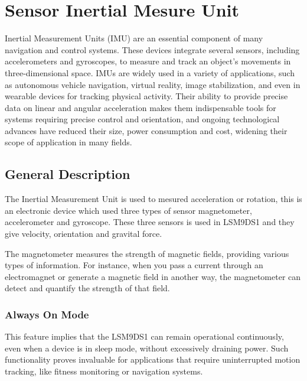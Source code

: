 %
%

\chapter{Sensor Inertial Mesure Unit}

Inertial Measurement Units (IMU) are an essential component of many navigation and control systems. These devices integrate several sensors, including accelerometers and gyroscopes, to measure and track an object's movements in three-dimensional space. IMUs are widely used in a variety of applications, such as autonomous vehicle navigation, virtual reality, image stabilization, and even in wearable devices for tracking physical activity. Their ability to provide precise data on linear and angular acceleration makes them indispensable tools for systems requiring precise control and orientation, and ongoing technological advances have reduced their size, power consumption and cost, widening their scope of application in many fields. 
\cite{st_lsm9ds1:2025} \cite{analogdevices:2024} 


\section{General Description }

The Inertial Measurement Unit is used to mesured acceleration or rotation, this is an electronic device which used three types of sensor magnetometer, accelerometer and gyroscope. These three sensors is used in LSM9DS1 and they give velocity, orientation and gravital force. 

The magnetometer measures the strength of magnetic fields, providing various types of information. For instance, when you pass a current through an electromagnet or generate a magnetic field in another way, the magnetometer can detect and quantify the strength of that field. \cite{st_microelectronics:2024}
\cite{STMicroelectronics_LSM9DS1:2024}

\subsection{Always On Mode}

This feature implies that the LSM9DS1 can remain operational continuously, even when a device is in sleep mode, without excessively draining power. Such functionality proves invaluable for applications that require uninterrupted motion tracking, like fitness monitoring or navigation systems. \cite{st_microelectronics:2024}

